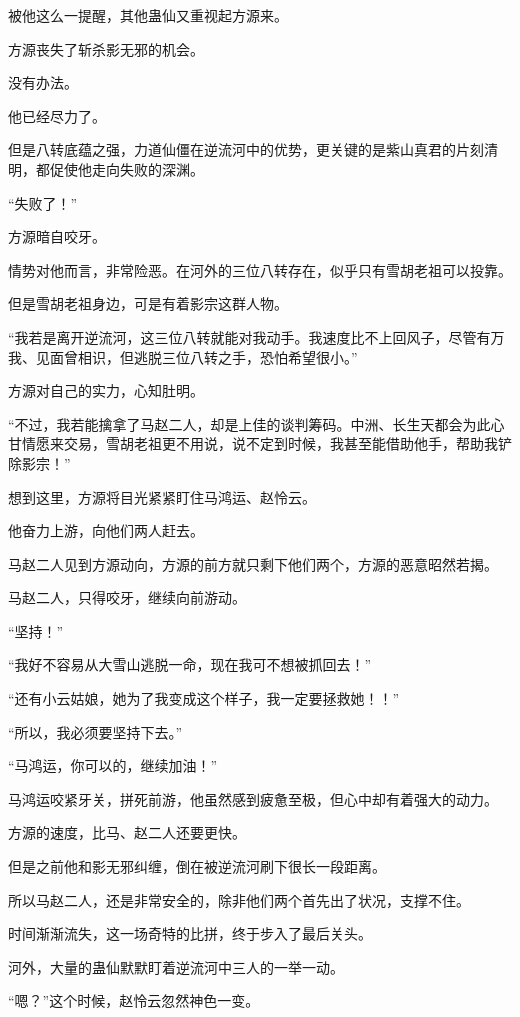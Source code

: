 \begin{this_body}
被他这么一提醒，其他蛊仙又重视起方源来。

方源丧失了斩杀影无邪的机会。

没有办法。

他已经尽力了。

但是八转底蕴之强，力道仙僵在逆流河中的优势，更关键的是紫山真君的片刻清明，都促使他走向失败的深渊。

“失败了！”

方源暗自咬牙。

情势对他而言，非常险恶。在河外的三位八转存在，似乎只有雪胡老祖可以投靠。

但是雪胡老祖身边，可是有着影宗这群人物。

“我若是离开逆流河，这三位八转就能对我动手。我速度比不上回风子，尽管有万我、见面曾相识，但逃脱三位八转之手，恐怕希望很小。”

方源对自己的实力，心知肚明。

“不过，我若能擒拿了马赵二人，却是上佳的谈判筹码。中洲、长生天都会为此心甘情愿来交易，雪胡老祖更不用说，说不定到时候，我甚至能借助他手，帮助我铲除影宗！”

想到这里，方源将目光紧紧盯住马鸿运、赵怜云。

他奋力上游，向他们两人赶去。

马赵二人见到方源动向，方源的前方就只剩下他们两个，方源的恶意昭然若揭。

马赵二人，只得咬牙，继续向前游动。

“坚持！”

“我好不容易从大雪山逃脱一命，现在我可不想被抓回去！”

“还有小云姑娘，她为了我变成这个样子，我一定要拯救她！！”

“所以，我必须要坚持下去。”

“马鸿运，你可以的，继续加油！”

马鸿运咬紧牙关，拼死前游，他虽然感到疲惫至极，但心中却有着强大的动力。

方源的速度，比马、赵二人还要更快。

但是之前他和影无邪纠缠，倒在被逆流河刷下很长一段距离。

所以马赵二人，还是非常安全的，除非他们两个首先出了状况，支撑不住。

时间渐渐流失，这一场奇特的比拼，终于步入了最后关头。

河外，大量的蛊仙默默盯着逆流河中三人的一举一动。

“嗯？”这个时候，赵怜云忽然神色一变。


\end{this_body}
